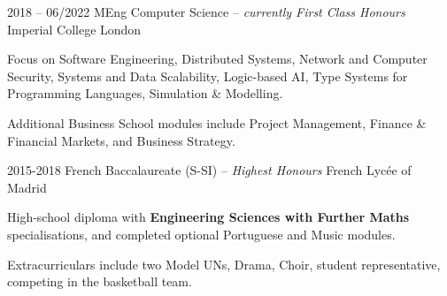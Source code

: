 \begin{entrylist}
    \entry
    {2018 -- 06/2022}
    {MEng Computer Science -- \emph{{\small currently} First Class Honours}}
    {Imperial College London}
    {
        Focus on Software Engineering,
        Distributed Systems,
        Network and Computer Security,
        Systems and Data Scalability,
        Logic-based AI,
        Type Systems for Programming Languages,
        Simulation \& Modelling.

        \para
        Additional Business School modules include Project Management, Finance \& Financial Markets, and
        Business Strategy.
    }
    \entry
    {2015-2018}
    {French Baccalaureate (S-SI) --  \emph{Highest Honours}}
    {French Lycée of Madrid}
    {
        High-school diploma with \textbf{Engineering Sciences with Further Maths} specialisations,
        and completed optional Portuguese and Music modules.

        \para
        Extracurriculars include two Model UNs, Drama, Choir, student representative, competing in
    the basketball team.
    }
\end{entrylist}
